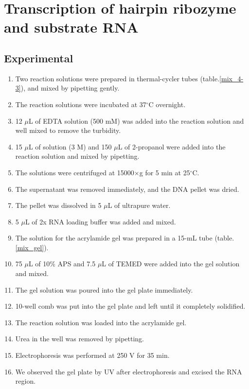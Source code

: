 \documentclass{ltjsarticle}
\theoremstyle{definition}
\numberwithin{equation}{section}
\newcommand{\D}{^\circ\text{C}}
\begin{document}
\section{Transcription of hairpin ribozyme and substrate RNA}
\subsection{Experimental}
\begin{enumerate}
\item Two reaction solutions were prepared in thermal-cycler tubes (table.\ref{mix_4-3}), and mixed by pipetting gently.
\item The reaction solutions were incubated at 37$\D$ overnight.
\item 12 $\mu$L of EDTA solution (500 mM) was added into the reaction solution and well mixed to remove the turbidity.
\item 15 $\mu$L of  solution (3 M) and 150 $\mu$L of 2-propanol were added into the reaction solution and mixed by pipetting.
\item The solutions were centrifuged at 15000$\times$g for 5 min at 25$\D$.
\item The supernatant was removed immediately, and the DNA pellet was dried.
\item The pellet was dissolved in 5 $\mu$L of ultrapure water.
\item 5 $\mu$L of 2x RNA loading buffer was added and mixed.
\item The solution for the acrylamide gel was prepared in a 15-mL tube (table.\ref{mix_gel}).
\item 75 $\mu$L of 10\% APS and 7.5 $\mu$L of TEMED were added into the gel solution and mixed.
\item The gel solution was poured into the gel plate immediately.
\item 10-well comb was put into the gel plate and left until it completely solidified.
\item The reaction solution was loaded into the acrylamide gel.
\item Urea in the well was removed by pipetting.
\item Electrophoresis was performed at 250 V for 35 min.
\item We observed the gel plate by UV after electrophoresis and excised the RNA region. 

\end{enumerate}
\end{document}
